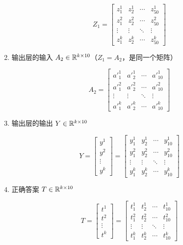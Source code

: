 \documentclass[12pt,a4paper]{amsart}
\begin{document}
\begin{enumerate}
		\begin{equation}
			Z_1 = \begin{bmatrix}
				z_1^1  & z_2^1  & \cdots & z_{50}^1 \\
				z_1^2  & z_2^2  & \cdots & z_{50}^2 \\
				\vdots & \vdots & \ddots & \vdots    \\
				z_1^k  & z_2^k  & \cdots & z_{50}^k
			\end{bmatrix}
		\end{equation}

	\item 输出层的输入 $A_2 \in \mathbb{R}^{k \times 10}$（$Z_1 = A_2$，是同一个矩阵）

		\begin{equation}
			A_2 = \begin{bmatrix}
				{a'}_1^1 & {a'}_2^1 & \cdots & {a'}_{10}^1 \\
				{a'}_1^2 & {a'}_2^2 & \cdots & {a'}_{10}^2 \\
				\vdots   & \vdots   & \ddots & \vdots      \\
				{a'}_1^k & {a'}_2^k & \cdots & {a'}_{10}^k
			\end{bmatrix}
		\end{equation}

	\item 输出层的输出 $Y \in \mathbb{R}^{k \times 10}$

		\begin{equation}
			Y = \begin{bmatrix}
				y^1    \\
				y^2    \\
				\vdots \\
				y^k
			\end{bmatrix} = \begin{bmatrix}
				y_1^1  & y_2^1  & \cdots & y_{10}^1 \\
				y_1^2  & y_2^2  & \cdots & y_{10}^2 \\
				\vdots & \vdots & \ddots & \vdots    \\
				y_1^k  & y_2^k  & \cdots & y_{10}^k
			\end{bmatrix}
		\end{equation}

	\item 正确答案 $T \in \mathbb{R}^{k\times 10}$

		\begin{equation}
			T = \begin{bmatrix}
				t^1    \\
				t^2    \\
				\vdots \\
				t^k
			\end{bmatrix} = \begin{bmatrix}
				t_1^1  & t_2^1  & \cdots & t_{10}^1 \\
				t_1^2  & t_2^2  & \cdots & t_{10}^2 \\
				\vdots & \vdots & \ddots & \vdots    \\
				t_1^k  & t_2^k  & \cdots & t_{10}^k
			\end{bmatrix}
		\end{equation}

\end{enumerate}
\end{document}
